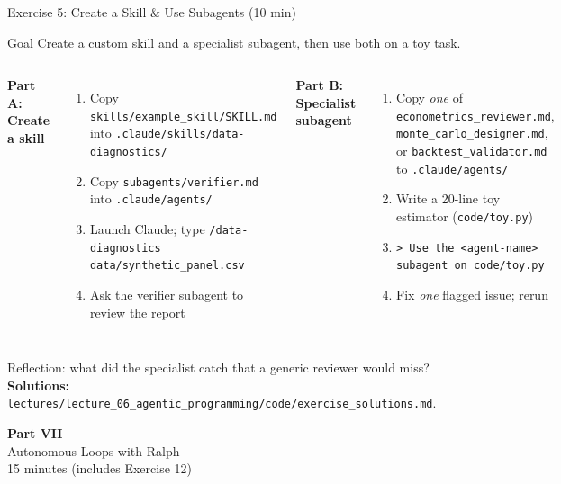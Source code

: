 \documentclass[aspectratio=169,10pt]{beamer}
\newcommand{\emphc}[1]{\textcolor{harvardcrimson}{#1}}
\begin{document}
\begin{frame}[fragile]{Exercise 5: Create a Skill \& Use Subagents {\small(10 min)}}
\scriptsize
\begin{exampleblock}{Goal}
Create a custom skill and a specialist subagent, then use both on a toy task.
\end{exampleblock}

\vspace{0.2em}
\begin{columns}[T]
\textbf{Part A: Create a skill}
\begin{enumerate}\itemsep0pt
    \item Copy \texttt{skills/example\_skill/SKILL.md} into \texttt{.claude/skills/data-diagnostics/}
    \item Copy \texttt{subagents/verifier.md} into \texttt{.claude/agents/}
    \item Launch Claude; type \texttt{/data-diagnostics data/synthetic\_panel.csv}
    \item Ask the verifier subagent to review the report
\end{enumerate}

\textbf{Part B: Specialist subagent}
\begin{enumerate}\itemsep0pt
    \item Copy \emph{one} of \texttt{econometrics\_reviewer.md}, \texttt{monte\_carlo\_designer.md}, or \texttt{backtest\_validator.md} to \texttt{.claude/agents/}
    \item Write a 20-line toy estimator (\texttt{code/toy.py})
    \item \texttt{> Use the <agent-name> subagent on code/toy.py}
    \item Fix \emph{one} flagged issue; rerun
\end{enumerate}
\end{columns}

\vspace{0.2em}
\emphc{Reflection:} what did the specialist catch that a generic reviewer would miss?
\textbf{Solutions:} \texttt{lectures/lecture\_06\_agentic\_programming/code/exercise\_solutions.md}.
\end{frame}


\begin{frame}{}
\vfill
\begin{center}
{\Huge \textcolor{uzhblue}{\textbf{Part VII}}}\\[12pt]
{\LARGE Autonomous Loops with Ralph}\\[6pt]
{\small 15 minutes (includes Exercise 12)}
\end{center}
\vfill
\end{frame}
\end{document}
